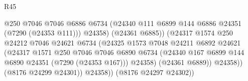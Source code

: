 \begin{lexlean}{R45}
\begin{coremodule}
{                                                @250
                                                @7046
                                                @7046
                                                @6886
                                                @6734
                                                (@24340
                                                  @111
                                                  @6899
                                                  @144
                                                  @6886
                                                  @24351
                                                  (@7290 (@24353 @111)))
                                                @24358)
                                              (@24361 @6885))
                                            (@24317
                                              @1574
                                              @250
                                              @24212
                                              @7046
                                              @24621
                                              @6734
                                              (@24325
                                                @1573
                                                @7048
                                                @24211
                                                @6892
                                                @24621
                                                (@24317
                                                  @1571
                                                  @250
                                                  @7046
                                                  @7046
                                                  @6890
                                                  @6734
                                                  (@24340
                                                    @167
                                                    @6899
                                                    @144
                                                    @6890
                                                    @24351
                                                    (@7290 (@24353 @167)))
                                                  @24358)
                                                (@24361 @6889))
                                              @24358))
                                          (@8176 @24299 @24301))
                                        @24358))
                                    (@8176 @24297 @24302))
}
\end{coremodule}
\end{lexlean}

